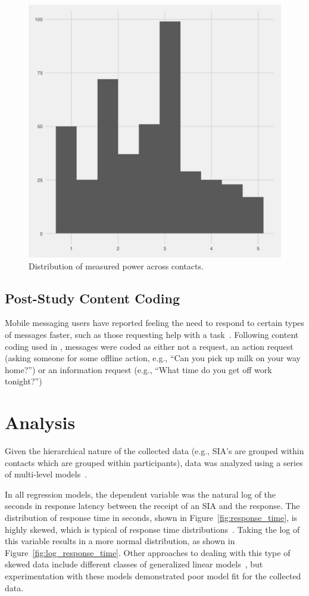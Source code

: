\documentclass[12pt]{nuthesis}	%
\begin{document}
\begin{figure}[h]
\centering
\includegraphics[width=.7\textwidth]{figures/power_distribution}
\caption{Distribution of measured power across contacts.}
\label{fig:power}
\end{figure}

\subsection{Post-Study Content Coding}

Mobile messaging users have reported feeling the need to respond to certain types of messages faster, such as those requesting help with a task~\citep{cui2016beyond}. Following content coding used in \citet{dabbish2005understanding}, messages were coded as either not a request, an action request (asking someone for some offline action, e.g., ``Can you pick up milk on your way home?'') or an information request (e.g., ``What time do you get off work tonight?'')

\section{Analysis}

Given the hierarchical nature of the collected data (e.g., SIA's are grouped within contacts which are grouped within participants), data was analyzed using a series of multi-level models~\citep{gelman2007data}.

In all regression models, the dependent variable was the natural log of the seconds in response latency between the receipt of an SIA and the response. The distribution of response time in seconds, shown in Figure~\ref{fig:response_time}, is highly skewed, which is typical of response time distributions~\citep{kalman2006pauses}. Taking the log of this variable results in a more normal distribution, as shown in Figure~\ref{fig:log_response_time}. Other approaches to dealing with this type of skewed data include different classes of generalized linear models~\citep[see e.g.,][]{buntin2004too,dick2004beyond,manning2001estimating}, but experimentation with these models demonstrated poor model fit for the collected data.
\end{document}
